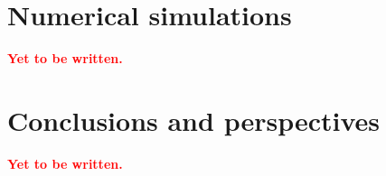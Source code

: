 \documentclass[10pt,a4paper]{amsart}
\theoremstyle{exampstyle}
\theoremstyle{exampnotations}
\begin{document}
\section{Numerical simulations}
\label{S.NumericalSimulations}
\textbf{\textcolor{red}{Yet to be written.}}

\section{Conclusions and perspectives}
\label{S.Conclusion}
\textbf{\textcolor{red}{Yet to be written.}}



\end{document}
